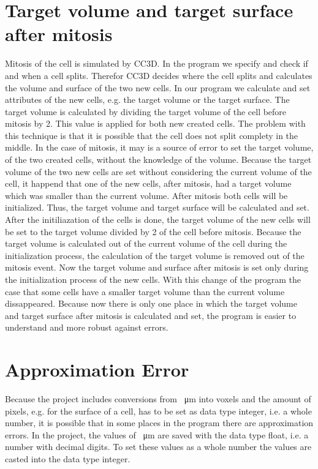 \section{Target volume and target surface after mitosis}
Mitosis of the cell is simulated by \ac{CC3D}. In the program we specify and check if and when a cell splits. Therefor \ac{CC3D} decides where the cell splits and calculates the volume and surface of the two new cells. In our program we calculate and set attributes of the new cells, e.g. the target volume or the target surface. \newline 
The target volume is calculated by dividing the target volume of the cell before mitosis by 2. This value is applied for both new created cells. The problem with this technique is that it is possible that the cell does not split complety in the middle. In the case of mitosis, it may is a source of error to set the target volume, of the two created cells, without the knowledge of the volume. Because the target volume of the two new cells are set without considering the current volume of the cell, it happend that one of the new cells, after mitosis, had a target volume which was smaller than the current volume. \newline
After mitosis both cells will be initialized. Thus, the target volume and target surface will be calculated and set. After the initiliazation of the cells is done, the target volume of the new cells will be set to the target volume divided by 2 of the cell before mitosis. \newline
Because the target volume is calculated out of the current volume of the cell during the initialization process, the calculation of the target volume is removed out of the mitosis event. Now the target volume and surface after mitosis is set only during the initialization process of the new cells. \newline
With this change of the program the case that some cells have a smaller target volume than the current volume dissappeared. Because now there is only one place in which the target volume and target surface after mitosis is calculated and set, the program is easier to understand and more robust against errors.



\section{Approximation Error}
Because the project includes conversions from \SI{}{\micro\metre} into voxels and the amount of pixels, e.g. for the surface of a cell, has to be set as data type integer, i.e. a whole number, it is possible that in some places in the program there are approximation errors. In the project, the values of \SI{}{\micro\metre} are saved with the data type float, i.e. a number with decimal digits. To set these values as a whole number the values are casted into the data type integer. 

